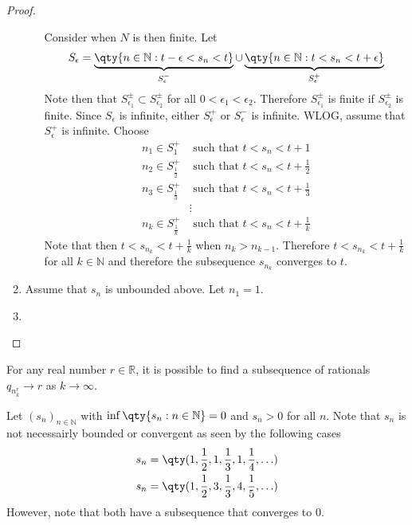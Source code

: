 \documentclass[../notes.tex]{subfiles}
\begin{document}
\begin{proof}
\begin{enumerate}
\begin{enumerate}
                Consider when $N$ is then finite. Let
                \begin{align*}
                    S_\epsilon = \underbrace{\qty{n \in \mathbb{N} : t - \epsilon < s_n < t}}_{S^{-}_\epsilon} \cup \underbrace{\qty{n \in \mathbb{N} : t < s_n < t + \epsilon}}_{S^{+}_\epsilon}
                \end{align*}
                Note then that $S_{\epsilon_1}^\pm \subset S_{\epsilon_2}^\pm$ for all $0 < \epsilon_1 < \epsilon_2$. Therefore $S_{\epsilon_1}^\pm$ is finite if $S_{\epsilon_2}^\pm$ is finite. Since $S_\epsilon$ is infinite, either $S_\epsilon^+$ or $S_\epsilon^-$ is infinite. WLOG, assume that $S_\epsilon^+$ is infinite. Choose 
                \begin{align*}
                    n_1 \in S_1^+ &\text{ such that } t < s_n < t + 1 \\
                    n_2 \in S_{\frac{1}{2}}^+ &\text{ such that } t < s_n < t + \frac{1}{2} \\
                    n_3 \in S_{\frac{1}{3}}^+ &\text{ such that } t < s_n < t + \frac{1}{3} \\
                                              &\vdots \\
                    n_k \in S_{\frac{1}{k}}^+ &\text{ such that } t < s_n < t + \frac{1}{k}
                \end{align*}
                Note that then $t < s_{n_k} < t + \frac{1}{k}$ when $n_k > n_{k-1}$. Therefore $t < s_{n_k} < t + \frac{1}{k}$ for all $k \in \mathbb{N}$ and therefore the subsequence $s_{n_k}$ converges to $t$.
        \end{enumerate}
    \item
        Assume that $s_n$ is unbounded above. Let $n_1 = 1$.
    \item %
    \end{enumerate}
\end{proof}

\begin{example}
    For any real number $r \in \mathbb{R}$, it is possible to find a subsequence of rationals $q_{n^r_k} \to r$ as $k \to \infty$.
\end{example}

\begin{example}
    Let $(s_n)_{n\in \mathbb{N}}$ with $\inf\qty{s_n : n \in \mathbb{N}} = 0$ and $s_n > 0$ for all $n$. Note that $s_n$ is not necessairly bounded or convergent as seen by the following cases
    \begin{align*}
        s_n = \qty(1, \frac{1}{2}, 1, \frac{1}{3}, 1, \frac{1}{4}, \ldots) \\
        s_n = \qty(1, \frac{1}{2}, 3, \frac{1}{3}, 4, \frac{1}{5}, \ldots) \\
    \end{align*}
    However, note that both have a subsequence that converges to $0$.
\end{example}
\end{document}

